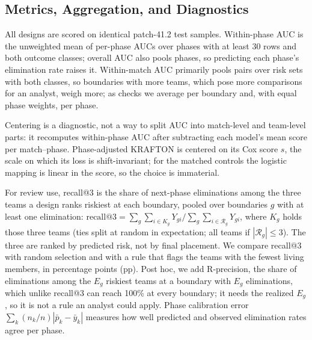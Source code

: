 \documentclass[sigconf,anonymous]{acmart}
\begin{document}
\subsection{Metrics, Aggregation, and Diagnostics}
\label{sec:method:units}
All designs are scored on identical patch-41.2 test samples. Within-phase AUC is the unweighted mean of per-phase AUCs over phases with at least 30 rows and both outcome classes; overall AUC also pools phases, so predicting each phase's elimination rate raises it. Within-match AUC primarily pools pairs over risk sets with both classes, so boundaries with more teams, which pose more comparisons for an analyst, weigh more; as checks we average per boundary and, with equal phase weights, per phase.

Centering is a diagnostic, not a way to split AUC into match-level and team-level parts: it recomputes within-phase AUC after subtracting each model's mean score per match--phase. Phase-adjusted KRAFTON is centered on its Cox score $s$, the scale on which its loss is shift-invariant; for the matched controls the logistic mapping is linear in the score, so the choice is immaterial.

For review use, recall@3 is the share of next-phase eliminations among the three teams a design ranks riskiest at each boundary, pooled over boundaries $g$ with at least one elimination: $\mathrm{recall@3}=\sum_g\sum_{i\in K_g}Y_{gi}\big/\sum_g\sum_{i\in\mathcal{R}_g}Y_{gi}$, where $K_g$ holds those three teams (ties split at random in expectation; all teams if $|\mathcal{R}_g|\le3$). The three are ranked by predicted risk, not by final placement. We compare recall@3 with random selection and with a rule that flags the teams with the fewest living members, in percentage points (pp). Post hoc, we add R-precision, the share of eliminations among the $E_g$ riskiest teams at a boundary with $E_g$ eliminations, which unlike recall@3 can reach 100\% at every boundary; it needs the realized $E_g$, so it is not a rule an analyst could apply. Phase calibration error $\sum_k(n_k/n)|\bar p_k-\bar y_k|$ measures how well predicted and observed elimination rates agree per phase.
\end{document}
